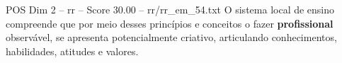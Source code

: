 \begin{textsample}{POS Dim 2 – rr – Score 30.00 – rr/rr\_em\_54.txt}
O sistema local de ensino compreende que por meio desses princípios e conceitos o fazer \textbf{profissional} observável, se apresenta potencialmente criativo, articulando conhecimentos, habilidades, atitudes e valores.

\end{textsample}
